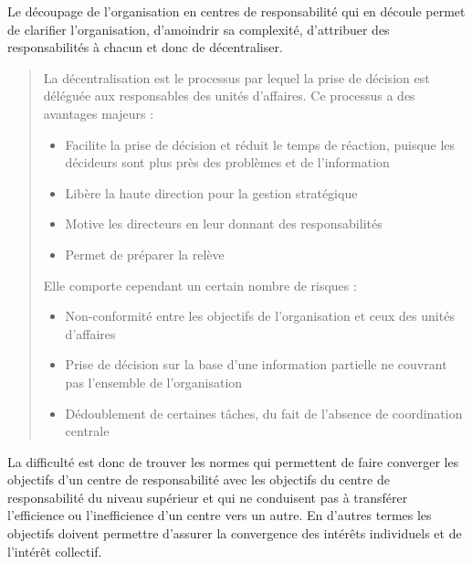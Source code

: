 \documentclass{tufte-handout}
\begin{document}
Le découpage de l’organisation en centres de responsabilité qui en découle permet de clarifier l’organisation, d’amoindrir sa complexité, d’attribuer des responsabilités à chacun et donc de décentraliser.\\
\begin{quote}
La décentralisation est le processus par lequel la prise de décision est déléguée aux responsables des unités d'affaires. Ce processus a des avantages majeurs :\\
\begin{itemize}
\item Facilite la prise de décision et réduit le temps de réaction, puisque les décideurs sont plus près des problèmes et de l’information\\
\item Libère la haute direction pour la gestion stratégique\\
\item Motive les directeurs en leur donnant des responsabilités\\
\item Permet de préparer la relève\\
\end{itemize}
Elle comporte cependant un certain nombre de risques :\\
\begin{itemize}
\item Non-conformité entre les objectifs de l’organisation et ceux des unités d’affaires\\
\item Prise de décision sur la base d’une information partielle ne couvrant pas l'ensemble de l'organisation\\
\item Dédoublement de certaines tâches, du fait de l'absence de coordination centrale\\
\end{itemize}
\end{quote}
La difficulté est donc de trouver les normes qui permettent de faire converger les objectifs d’un centre de responsabilité avec les objectifs du centre de responsabilité du niveau supérieur et qui ne conduisent pas à transférer l’efficience ou l’inefficience d’un centre vers un autre. En d’autres termes les objectifs doivent permettre d’assurer la convergence des intérêts individuels et de l’intérêt collectif.\\
\end{document}
